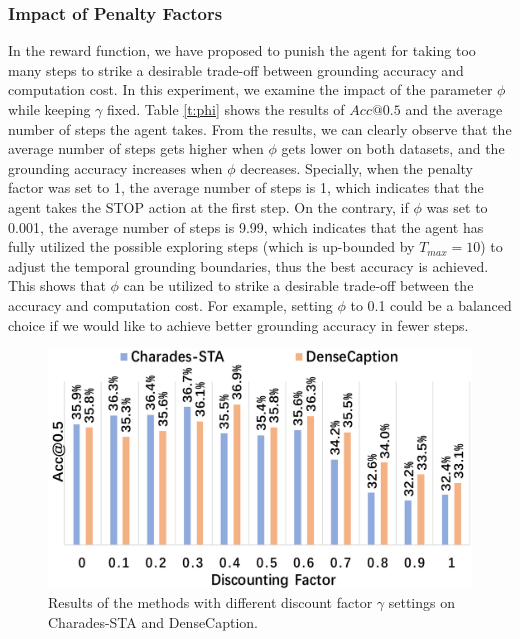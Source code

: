 \documentclass[letterpaper]{article} %
\begin{document}
\subsubsection{Impact of Penalty Factors}
In the reward function, we have proposed to punish the agent for taking too many steps to strike a desirable trade-off between grounding accuracy and computation cost. In this experiment, we examine the impact of the parameter $\phi$ while keeping $\gamma$ fixed. Table \ref{t:phi} shows the results of $Acc@0.5$ and the average number of steps the agent takes. From the results, we can clearly observe that the average number of steps gets higher when $\phi$ gets lower on both datasets, and the grounding accuracy increases when $\phi$ decreases. Specially, when the penalty factor was set to 1, the average number of steps is 1, which indicates that the agent takes the STOP action at the first step. On the contrary, if $\phi$ was set to 0.001, the average number of steps is 9.99, which indicates that the agent has fully utilized the possible exploring steps (which is up-bounded by $T_{max}=10$) to adjust the temporal grounding boundaries, thus the best accuracy is achieved.
This shows that $\phi$ can be utilized to strike a desirable trade-off between the accuracy and computation cost. For example, setting $\phi$ to 0.1 could be a balanced choice if we would like to achieve better grounding accuracy in fewer steps.

\begin{figure}[!t]
\begin{center}
\includegraphics[width=0.98\columnwidth]{./gamma3.pdf}
\end{center}
\caption{Results of the methods with different discount factor $\gamma$ settings on Charades-STA and DenseCaption.}
\label{fig:gamma}
\end{figure}
\end{document}
